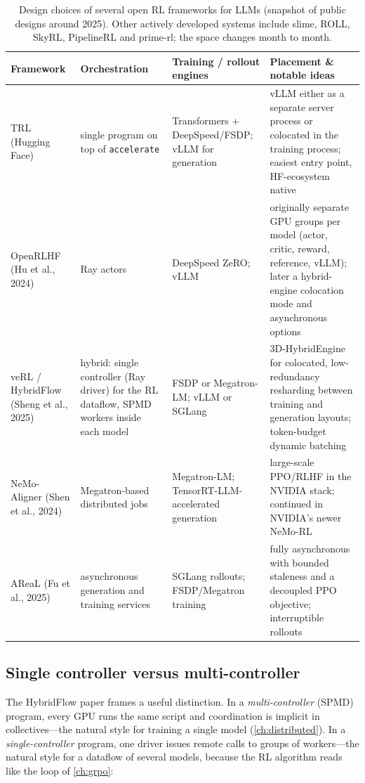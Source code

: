 \begin{table}[t]
\centering\small
\begin{tabularx}{\linewidth}{@{}l>{\raggedright\arraybackslash}X>{\raggedright\arraybackslash}X>{\raggedright\arraybackslash}X@{}}
\toprule
Framework & Orchestration & Training / rollout engines & Placement \& notable ideas\\
\midrule
TRL (Hugging Face) & single program on top of \texttt{accelerate} &
Transformers + DeepSpeed/FSDP; vLLM for generation & vLLM either as a separate server
process or colocated in the training process; easiest entry point, HF-ecosystem native\\
OpenRLHF (Hu et al., 2024) & Ray actors & DeepSpeed ZeRO; vLLM &
originally separate GPU groups per model (actor, critic, reward, reference, vLLM); later a
hybrid-engine colocation mode and asynchronous options\\
veRL / HybridFlow (Sheng et al., 2025) & hybrid: single controller (Ray driver) for the
RL dataflow, SPMD workers inside each model & FSDP or Megatron-LM; vLLM or SGLang &
3D-HybridEngine for colocated, low-redundancy resharding between training and generation
layouts; token-budget dynamic batching\\
NeMo-Aligner (Shen et al., 2024) & Megatron-based distributed jobs & Megatron-LM;
TensorRT-LLM-accelerated generation & large-scale PPO/RLHF in the NVIDIA stack; continued
in NVIDIA's newer NeMo-RL\\
AReaL (Fu et al., 2025) & asynchronous generation and training services &
SGLang rollouts; FSDP/Megatron training & fully asynchronous with bounded staleness and a
decoupled PPO objective; interruptible rollouts\\
\bottomrule
\end{tabularx}
\caption{Design choices of several open RL frameworks for LLMs (snapshot of public designs
around 2025). Other actively developed systems include slime, ROLL, SkyRL, PipelineRL and
prime-rl; the space changes month to month.}
\label{tab:rlsys:frameworks}
\end{table}

\subsection{Single controller versus multi-controller}

The HybridFlow paper frames a useful distinction. In a \emph{multi-controller} (SPMD) program,
every GPU runs the same script and coordination is implicit in collectives---the natural style
for training a single model (\cref{ch:distributed}). In a \emph{single-controller} program, one
driver issues remote calls to groups of workers---the natural style for a dataflow of several
models, because the RL algorithm reads like the loop of \cref{ch:grpo}:

